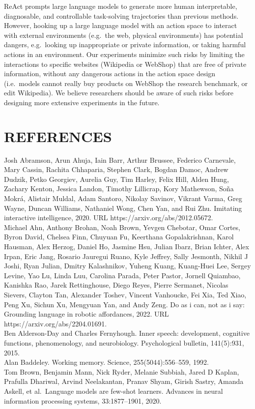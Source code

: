 \documentclass[
]{article}
\begin{document}
ReAct prompts large language models to generate more human
interpretable, diagnosable, and controllable task-solving trajectories
than previous methods. However, hooking up a large language model with
an action space to interact with external environments (e.g.~the web,
physical environments) has potential dangers, e.g.~looking up
inappropriate or private information, or taking harmful actions in an
environment. Our experiments minimize such risks by limiting the
interactions to specific websites (Wikipedia or WebShop) that are free
of private information, without any dangerous actions in the action
space design (i.e.~models cannot really buy products on WebShop the
research benchmark, or edit Wikipedia). We believe researchers should be
aware of such risks before designing more extensive experiments in the
future.

\section{REFERENCES}\label{references}

Josh Abramson, Arun Ahuja, Iain Barr, Arthur Brussee, Federico
Carnevale, Mary Cassin, Rachita Chhaparia, Stephen Clark, Bogdan Damoc,
Andrew Dudzik, Petko Georgiev, Aurelia Guy, Tim Harley, Felix Hill,
Alden Hung, Zachary Kenton, Jessica Landon, Timothy Lillicrap, Kory
Mathewson, Soña Mokrá, Alistair Muldal, Adam Santoro, Nikolay Savinov,
Vikrant Varma, Greg Wayne, Duncan Williams, Nathaniel Wong, Chen Yan,
and Rui Zhu. Imitating interactive intelligence, 2020. URL
https://arxiv.org/abs/2012.05672.\\
Michael Ahn, Anthony Brohan, Noah Brown, Yevgen Chebotar, Omar Cortes,
Byron David, Chelsea Finn, Chuyuan Fu, Keerthana Gopalakrishnan, Karol
Hausman, Alex Herzog, Daniel Ho, Jasmine Hsu, Julian Ibarz, Brian
Ichter, Alex Irpan, Eric Jang, Rosario Jauregui Ruano, Kyle Jeffrey,
Sally Jesmonth, Nikhil J Joshi, Ryan Julian, Dmitry Kalashnikov, Yuheng
Kuang, Kuang-Huei Lee, Sergey Levine, Yao Lu, Linda Luu, Carolina
Parada, Peter Pastor, Jornell Quiambao, Kanishka Rao, Jarek
Rettinghouse, Diego Reyes, Pierre Sermanet, Nicolas Sievers, Clayton
Tan, Alexander Toshev, Vincent Vanhoucke, Fei Xia, Ted Xiao, Peng Xu,
Sichun Xu, Mengyuan Yan, and Andy Zeng. Do as i can, not as i say:
Grounding language in robotic affordances, 2022. URL
https://arxiv.org/abs/2204.01691.\\
Ben Alderson-Day and Charles Fernyhough. Inner speech: development,
cognitive functions, phenomenology, and neurobiology. Psychological
bulletin, 141(5):931, 2015.\\
Alan Baddeley. Working memory. Science, 255(5044):556--559, 1992.\\
Tom Brown, Benjamin Mann, Nick Ryder, Melanie Subbiah, Jared D Kaplan,
Prafulla Dhariwal, Arvind Neelakantan, Pranav Shyam, Girish Sastry,
Amanda Askell, et al.~Language models are few-shot learners. Advances in
neural information processing systems, 33:1877--1901, 2020.
\end{document}
